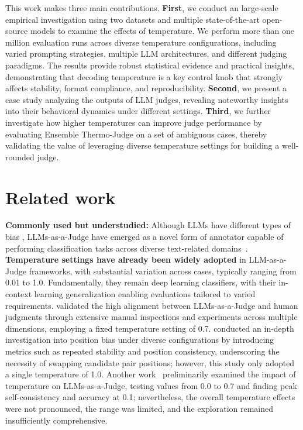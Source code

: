 \documentclass[11pt]{article}
\begin{document}
This work makes three main contributions. \textbf{First}, we conduct an large-scale empirical investigation using two datasets and multiple state-of-the-art open-source models to examine the effects of temperature. We perform more than one million evaluation runs across diverse temperature configurations, including varied prompting strategies, multiple LLM architectures, and different judging paradigms. The results provide robust statistical evidence and practical insights, demonstrating that decoding temperature is a key control knob that strongly affects stability, format compliance, and reproducibility. \textbf{Second}, we present a case study analyzing the outputs of LLM judges, revealing noteworthy insights into their behavioral dynamics under different settings. \textbf{Third}, we further investigate how higher temperatures can improve judge performance by evaluating Ensemble Thermo-Judge on a set of ambiguous cases, thereby validating the value of leveraging diverse temperature settings for building a well-rounded judge.

\section{Related work}

\noindent \textbf{Commonly used but understudied:} Although LLMs have different types of bias \cite{ye2024justiceprejudicequantifyingbiases,shi-etal-2025-judging,chen-etal-2024-humans}, LLMs-as-a-Judge have emerged as a novel form of annotator capable of performing classification tasks across diverse text-related domains~\cite{GU2026101253}. \textbf{Temperature settings have already been widely adopted} in LLM-as-a-Judge frameworks, with substantial variation across cases, typically ranging from 0.01 to 1.0. Fundamentally, they remain deep learning classifiers, with their in-context learning generalization enabling evaluations tailored to varied requirements. \citeauthor{10.5555/3666122.3668142} validated the high alignment between LLMs-as-a-Judge and human judgments through extensive manual inspections and experiments across multiple dimensions, employing a fixed temperature setting of 0.7. \citeauthor{shi-etal-2025-judging} conducted an in-depth investigation into position bias under diverse configurations by introducing metrics such as repeated stability and position consistency, underscoring the necessity of swapping candidate pair positions; however, this study only adopted a single temperature of 1.0. Another work~\cite{wei2025systematicevaluationllmasajudgellm} preliminarily examined the impact of temperature on LLMs-as-a-Judge, testing values from 0.0 to 0.7 and finding peak self-consistency and accuracy at 0.1; nevertheless, the overall temperature effects were not pronounced, the range was limited, and the exploration remained insufficiently comprehensive. 
\end{document}
